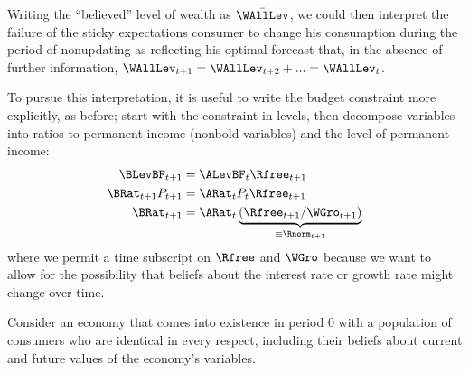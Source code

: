 \documentclass{handout}
\begin{document}
Writing the ``believed'' level of wealth as $\bar{\WAllLev}$, we could then interpret the
failure of the sticky expectations consumer to change his consumption during the period 
of nonupdating as reflecting his optimal forecast that, in the absence of further information,
$\bar{\WAllLev}_{t+1} = \bar{\WAllLev}_{t+2} + ... = \WAllLev_{t}$.  

To pursue this interpretation, it is useful to write the budget constraint more explicitly, 
as before; start with the constraint in levels, then decompose variables into ratios to permanent income (nonbold variables) and the level of permanent income:
\begin{equation}\begin{gathered}\begin{aligned}
    \BLevBF_{t+1} & =  \ALevBF_{t} \Rfree_{t+1}
\\  \BRat_{t+1}P_{t+1} & =  \ARat_{t}P_{t} \Rfree_{t+1}
\\  \BRat_{t+1} & =  \ARat_{t} \underbrace{(\Rfree_{t+1}/\WGro_{t+1})}_{\equiv \Rnorm_{t+1}}
\end{aligned}\end{gathered}\end{equation}
where we permit a time subscript on $\Rfree$ and $\WGro$ because we want to allow for the 
possibility that beliefs about the interest rate or growth rate might change over time.

Consider an economy that comes into existence in period $0$ with a population of 
consumers who are identical in every respect, including their beliefs about current and future
values of the economy's variables.  
\end{document}
